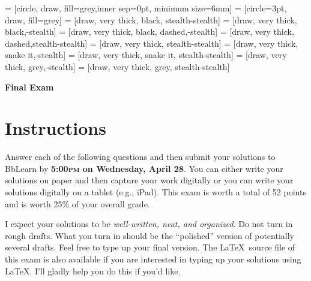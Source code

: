 \documentclass[11pt]{article}
\theoremstyle{definition}
\begin{document}
 = [circle, draw, fill=grey,inner sep=0pt, minimum size=6mm]
 = [circle=3pt, draw, fill=grey]
 = [draw, very  thick, black, stealth-stealth]
 = [draw, very  thick, black,-stealth]
 = [draw, very  thick, black, dashed,-stealth]
 = [draw, very thick, dashed,stealth-stealth]
 = [draw, very thick, stealth-stealth]
 = [draw, very thick, snake it,-stealth]
 = [draw, very thick, snake it, stealth-stealth]
 = [draw, very thick, grey,-stealth]
 = [draw, very thick, grey, stealth-stealth]

\begin{center}

{\Large\bf Final Exam}

\bigskip

  
  \bigskip
  

\end{center}

\section*{Instructions}

Answer each of the following questions and then submit your solutions to BbLearn by \textbf{5:00\textsc{pm} on Wednesday, April 28}. You can either write your solutions on paper and then capture your work digitally or you can write your solutions digitally on a tablet (e.g., iPad). This exam is worth a total of 52 points and is worth 25\% of your overall grade.

\bigskip

I expect your solutions to be \emph{well-written, neat, and organized}.  Do not turn in rough drafts.  What you turn in should be the ``polished'' version of potentially several drafts.  Feel free to type up your final version.  The \LaTeX\ source file of this exam is also available if you are interested in typing up your solutions using \LaTeX.  I'll gladly help you do this if you'd like.
\end{document}
